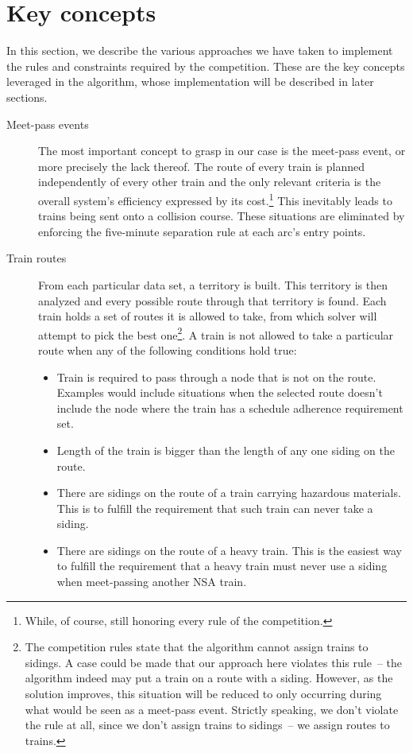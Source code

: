 \documentclass[10pt,a4paper,final]{article}
\begin{document}
\section{Key concepts}

In this section, we describe the various approaches we have taken to implement the rules and constraints required by the competition. These are the key concepts leveraged in the algorithm, whose implementation will be described in later sections.

\begin{description}

\item[Meet-pass events] The most important concept to grasp in our case is the meet-pass event, or more precisely the lack thereof. The route of every train is planned independently of every other train and the only relevant criteria is the overall system's efficiency expressed by its cost.\footnote{While, of course, still honoring every rule of the competition.} This inevitably leads to trains being sent onto a collision course. These situations are eliminated by enforcing the five-minute separation rule at each arc's entry points.

\item[Train routes] From each particular data set, a territory is built. This territory is then analyzed and every possible route through that territory is found. Each train holds a set of routes it is allowed to take, from which solver will attempt to pick the best one\footnote{The competition rules state that the algorithm cannot assign trains to sidings. A case could be made that our approach here violates this rule~-- the algorithm indeed may put a train on a route with a siding. However, as the solution improves, this situation will be reduced to only occurring during what would be seen as a meet-pass event. Strictly speaking, we don't violate the rule at all, since we don't assign trains to sidings~-- we assign routes to trains.}. A train is not allowed to take a particular route when any of the following conditions hold true:

\begin{itemize}
\item Train is required to pass through a node that is not on the route. Examples would include situations when the selected route doesn't include the node where the train has a schedule adherence requirement set.
\item Length of the train is bigger than the length of any one siding on the route.
\item There are sidings on the route of a train carrying hazardous materials. This is to fulfill the requirement that such train can never take a siding.
\item There are sidings on the route of a heavy train. This is the easiest way to fulfill the requirement that a heavy train must never use a siding when meet-passing another NSA train.
\end{itemize}


\end{description}
\end{document}
